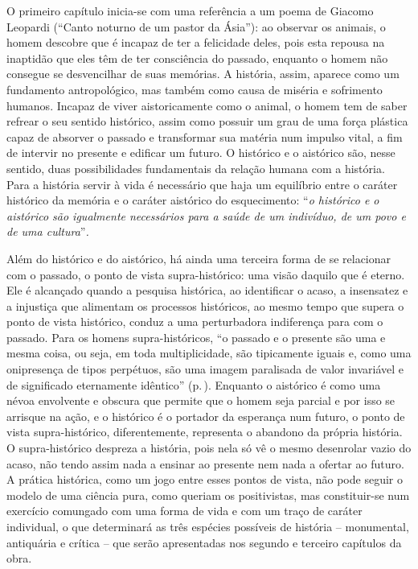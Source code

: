 O primeiro capítulo inicia-se com uma referência a um poema de Giacomo
Leopardi (``Canto noturno de um pastor da Ásia''): ao observar os
animais, o homem descobre que é incapaz de ter a felicidade deles, pois
esta repousa na inaptidão que eles têm de ter consciência do passado,
enquanto o homem não consegue se desvencilhar de suas memórias. A
história, assim, aparece como um fundamento antropológico, mas também
como causa de miséria e sofrimento humanos. Incapaz de viver
aistoricamente como o animal, o homem tem de saber refrear o seu sentido
histórico, assim como possuir um grau de uma força plástica capaz de
absorver o passado e transformar sua matéria num impulso vital, a fim de
intervir no presente e edificar um futuro. O histórico e o aistórico
são, nesse sentido, duas possibilidades fundamentais da relação humana
com a história. Para a história servir à vida é necessário que haja um
equilíbrio entre o caráter histórico da memória e o caráter aistórico do
esquecimento: ``\emph{o histórico e o aistórico são igualmente
necessários para a saúde de um indivíduo, de um povo e de uma
cultura}''\emph{.}

Além do histórico e do aistórico, há ainda uma terceira forma de se
relacionar com o passado, o ponto de vista supra-histórico: uma visão
daquilo que é eterno. Ele é alcançado quando a pesquisa histórica, ao
identificar o acaso, a insensatez e a injustiça que alimentam os
processos históricos, ao mesmo tempo que supera o ponto de vista
histórico, conduz a uma perturbadora indiferença para com o passado.
Para os homens supra-históricos, ``o passado e o presente são uma e
mesma coisa, ou seja, em toda multiplicidade, são tipicamente iguais e,
como uma onipresença de tipos perpétuos, são uma imagem paralisada de
valor invariável e de significado eternamente idêntico'' (p.\,\pageref{eternamenteidentico}). Enquanto
o aistórico é como uma névoa envolvente e obscura que permite que o
homem seja parcial e por isso se arrisque na ação, e o histórico é o
portador da esperança num futuro, o ponto de vista supra-histórico,
diferentemente, representa o abandono da própria história. O
supra-histórico despreza a história, pois nela só vê o mesmo desenrolar
vazio do acaso, não tendo assim nada a ensinar ao presente nem nada a
ofertar ao futuro. A prática histórica, como um jogo entre esses pontos
de vista, não pode seguir o modelo de uma ciência pura, como queriam os
positivistas, mas constituir-se num exercício comungado com uma forma de
vida e com um traço de caráter individual, o que determinará as três
espécies possíveis de história -- monumental, antiquária e crítica --
que serão apresentadas nos segundo e terceiro capítulos da obra.

